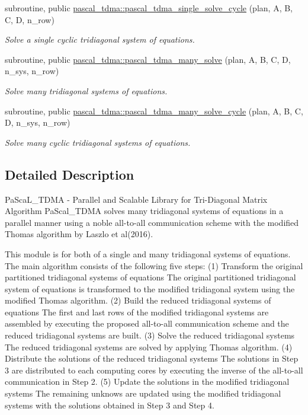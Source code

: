 \begin{DoxyCompactItemize}
subroutine, public \mbox{\hyperlink{namespacepascal__tdma_ac8e377fa86c75126380f0196f6046043}{pascal\+\_\+tdma\+::pascal\+\_\+tdma\+\_\+single\+\_\+solve\+\_\+cycle}} (plan, A, B, C, D, n\+\_\+row)
\begin{DoxyCompactList}\small\item\em Solve a single cyclic tridiagonal system of equations. \end{DoxyCompactList}\item 
subroutine, public \mbox{\hyperlink{namespacepascal__tdma_afa0c78b8377f5fe1059907befda3c940}{pascal\+\_\+tdma\+::pascal\+\_\+tdma\+\_\+many\+\_\+solve}} (plan, A, B, C, D, n\+\_\+sys, n\+\_\+row)
\begin{DoxyCompactList}\small\item\em Solve many tridiagonal systems of equations. \end{DoxyCompactList}\item 
subroutine, public \mbox{\hyperlink{namespacepascal__tdma_acbaed65e67ecbfd92a8f1d51d1b69fd5}{pascal\+\_\+tdma\+::pascal\+\_\+tdma\+\_\+many\+\_\+solve\+\_\+cycle}} (plan, A, B, C, D, n\+\_\+sys, n\+\_\+row)
\begin{DoxyCompactList}\small\item\em Solve many cyclic tridiagonal systems of equations. \end{DoxyCompactList}\end{DoxyCompactItemize}


\subsection{Detailed Description}
Pa\+Sca\+L\+\_\+\+T\+D\+MA -\/ Parallel and Scalable Library for Tri-\/\+Diagonal Matrix Algorithm Pa\+Scal\+\_\+\+T\+D\+MA solves many tridiagonal systems of equations in a parallel manner using a noble all-\/to-\/all communication scheme with the modified Thomas algorithm by Laszlo et al(2016). 

This module is for both of a single and many tridiagonal systems of equations. The main algorithm consists of the following five steps\+: (1) Transform the original partitioned tridiagonal systems of equations The original partitioned tridiagonal system of equations is transformed to the modified tridiagonal system using the modified Thomas algorithm. (2) Build the reduced tridiagonal systems of equations The first and last rows of the modified tridiagonal systems are assembled by executing the proposed all-\/to-\/all communication scheme and the reduced tridiagonal systems are built. (3) Solve the reduced tridiagonal systems The reduced tridiagonal systems are solved by applying Thomas algorithm. (4) Distribute the solutions of the reduced tridiagonal systems The solutions in Step 3 are distributed to each computing cores by executing the inverse of the all-\/to-\/all communication in Step 2. (5) Update the solutions in the modified tridiagonal systems The remaining unknows are updated using the modified tridiagonal systems with the solutions obtained in Step 3 and Step 4.

